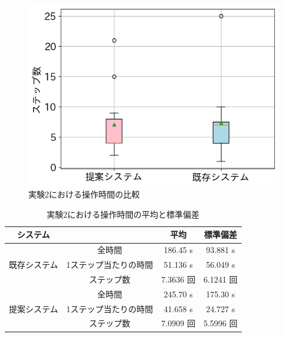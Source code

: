 \begin{figure}[h]
\begin{minipage}[b]{0.48\linewidth}
 \end{minipage}\\
 \begin{minipage}[b]{0.48\linewidth}
  \centering
  \includegraphics[scale=0.4]{./imgs/result/sofaStepCnt.png}
 \end{minipage}
 \caption{実験2における操作時間の比較}\label{fig:exp2TimeComp}
\end{figure}

\begin{table}[h]
	\centering
	\caption{実験2における操作時間の平均と標準偏差\label{tb:exp2TimeComp}}
		\begin{tabular}{|c|c|c|c|} \hline
                システム&&平均&標準偏差\\ \hline\hline
                \multirow{3}{*}{既存システム}&全時間&186.45 s&93.881 s \\ \cline{2-4}
                &1ステップ当たりの時間&51.136 s&56.049 s \\ \cline{2-4}
                &ステップ数&7.3636 回&6.1241 回 \\ \hline
                \multirow{3}{*}{提案システム}&全時間&245.70 s&175.30 s \\ \cline{2-4}
                &1ステップ当たりの時間&41.658 s&24.727 s \\ \cline{2-4}
                &ステップ数&7.0909 回&5.5996 回 \\ \hline
		\end{tabular}
\end{table}
\newpage


